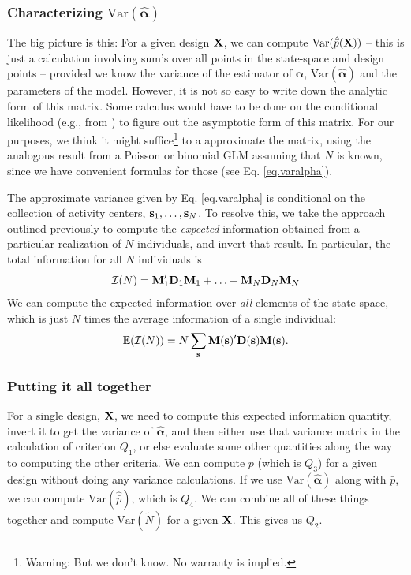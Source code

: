 \subsubsection{Characterizing $\mbox{Var}( \hat{\bm \alpha})$ }

The big picture is this: For a given design ${\bf X}$, we can compute
$\mbox{Var}(\hat{\bar{p}}({\bf X}))$ -- this is just a calculation
involving sum's over all points in the state-space and design points
-- provided we know the variance of the estimator of ${\bm \alpha}$,
$\mbox{Var}(\hat{\bm \alpha})$ and the parameters of the model.
However, it is not so easy to write down the analytic form of this
matrix.  Some calculus would have to be done on the conditional
likelihood (e.g., from \citet{borchers_efford:2008}) to figure out the
asymptotic form of this matrix.  For our purposes, we think it might
suffice\footnote{Warning: But we don't know. No warranty is implied.}
to a approximate the matrix, using the analogous result from a Poisson
or binomial GLM assuming that $N$ is known, since we have convenient
formulas for those (see Eq. \ref{eq.varalpha}).

The approximate variance given by Eq. \ref{eq.varalpha}
is conditional on the collection of activity centers, ${\bf
  s}_{1},\ldots,{\bf s}_{N}$. To resolve this, we take the approach
outlined previously to compute the {\it expected} information obtained
from a particular realization of $N$ individuals, and invert that
result. In particular, the total information for all $N$ individuals
is
\[
{\cal I}(N) =  {\bf M}_{1}' {\bf D}_{1} {\bf M}_{1} + \ldots +
{\bf M}_{N}{\bf D}_{N} {\bf M}_{N}
\]
We can compute
the expected information over {\it all} elements of the state-space,
which is just $N$ times the average information of a single
individual:
\[
\mathbb{E}( {\cal I}(N) ) = N  \sum_{{\bf s}}  {\bf M}({\bf s})'{\bf
  D}({\bf s}) {\bf M}({\bf s}).
\]


\subsubsection{Putting it all together}

For a single design, ${\bf X}$, we need
to compute this expected information quantity, invert it to get the
variance of $\hat{\bm \alpha}$, and then either use that variance
matrix in the calculation of criterion $Q_{1}$, or else evaluate some
other quantities along the way to computing the other criteria. 
We can compute $\bar{p}$ (which is $Q_{3}$) for a given design without
doing any variance calculations. 
If we use $\mbox{Var}(\hat{\bm \alpha})$ along with $\bar{p}$, we can
compute $\mbox{Var}(\hat{\bar{p}})$, which is $Q_{4}$. 
We can combine all of these things together and compute
$\mbox{Var}(\tilde{N})$ for a given ${\bf X}$. This gives us $Q_2$. 



